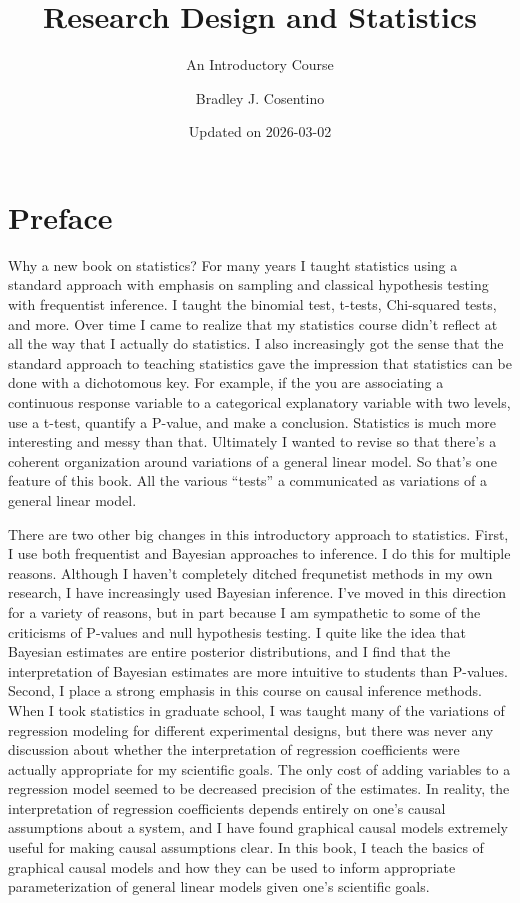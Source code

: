 \documentclass[
]{book}
\title{Research Design and Statistics}
\subtitle{An Introductory Course}
\author{Bradley J. Cosentino}
\date{Updated on 2026-03-02}
\begin{document}
\maketitle

{
\setcounter{tocdepth}{1}
\tableofcontents
}
\chapter*{Preface}\label{preface}

Why a new book on statistics? For many years I taught statistics using a standard approach with emphasis on sampling and classical hypothesis testing with frequentist inference. I taught the binomial test, t-tests, Chi-squared tests, and more. Over time I came to realize that my statistics course didn't reflect at all the way that I actually do statistics. I also increasingly got the sense that the standard approach to teaching statistics gave the impression that statistics can be done with a dichotomous key. For example, if the you are associating a continuous response variable to a categorical explanatory variable with two levels, use a t-test, quantify a P-value, and make a conclusion. Statistics is much more interesting and messy than that. Ultimately I wanted to revise so that there's a coherent organization around variations of a general linear model. So that's one feature of this book. All the various ``tests'' a communicated as variations of a general linear model.

There are two other big changes in this introductory approach to statistics. First, I use both frequentist and Bayesian approaches to inference. I do this for multiple reasons. Although I haven't completely ditched frequnetist methods in my own research, I have increasingly used Bayesian inference. I've moved in this direction for a variety of reasons, but in part because I am sympathetic to some of the criticisms of P-values and null hypothesis testing. I quite like the idea that Bayesian estimates are entire posterior distributions, and I find that the interpretation of Bayesian estimates are more intuitive to students than P-values. Second, I place a strong emphasis in this course on causal inference methods. When I took statistics in graduate school, I was taught many of the variations of regression modeling for different experimental designs, but there was never any discussion about whether the interpretation of regression coefficients were actually appropriate for my scientific goals. The only cost of adding variables to a regression model seemed to be decreased precision of the estimates. In reality, the interpretation of regression coefficients depends entirely on one's causal assumptions about a system, and I have found graphical causal models extremely useful for making causal assumptions clear. In this book, I teach the basics of graphical causal models and how they can be used to inform appropriate parameterization of general linear models given one's scientific goals.
\end{document}

